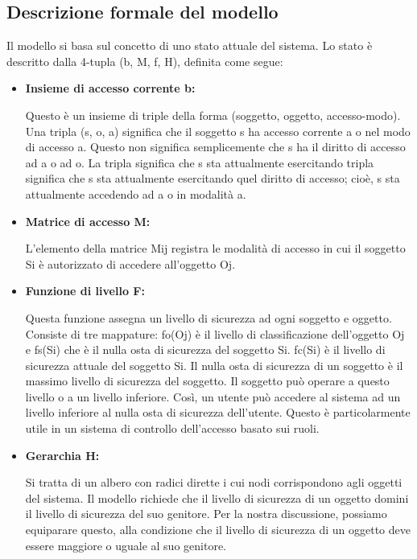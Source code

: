 \subsection{Descrizione formale del modello}
Il modello si basa sul concetto di uno stato attuale del sistema. Lo stato è descritto dalla 4-tupla (b, M, f, H), definita come segue:
\begin{itemize}
    \item \textbf{Insieme di accesso corrente b:}
    
    Questo è un insieme di triple della forma (soggetto, oggetto, accesso-modo). Una tripla (s, o, a) significa che il soggetto s ha accesso corrente a o nel modo di accesso a. Questo non significa semplicemente che s ha il diritto di accesso ad a o ad o. La tripla significa che s sta attualmente esercitando tripla significa che s sta attualmente esercitando quel diritto di accesso; cioè, s sta attualmente accedendo ad a o in modalità a.
    
    \item \textbf{Matrice di accesso M:}
    
    L'elemento della matrice Mij registra le modalità di accesso in cui il soggetto Si è autorizzato di accedere all'oggetto Oj.
    
    \item \textbf{Funzione di livello F:}
    
    Questa funzione assegna un livello di sicurezza ad ogni soggetto e oggetto. Consiste di tre mappature: fo(Oj) è il livello di classificazione dell'oggetto Oj e fs(Si) che è il nulla osta di sicurezza del soggetto Si. fc(Si) è il livello di sicurezza attuale del soggetto Si. Il nulla osta di sicurezza di un soggetto è il massimo livello di sicurezza del soggetto. Il soggetto può operare a questo livello o a un livello inferiore. Così, un utente può accedere al sistema ad un livello inferiore al nulla osta di sicurezza dell'utente. Questo è particolarmente utile in un sistema di controllo dell'accesso basato sui ruoli.
    
    \item \textbf{Gerarchia H:}
    
    Si tratta di un albero con radici dirette i cui nodi corrispondono agli oggetti del sistema. Il modello richiede che il livello di sicurezza di un oggetto domini il livello di sicurezza del suo genitore. Per la nostra discussione, possiamo equiparare questo, alla condizione che il livello di sicurezza di un oggetto deve essere maggiore o uguale al suo genitore.
\end{itemize}

